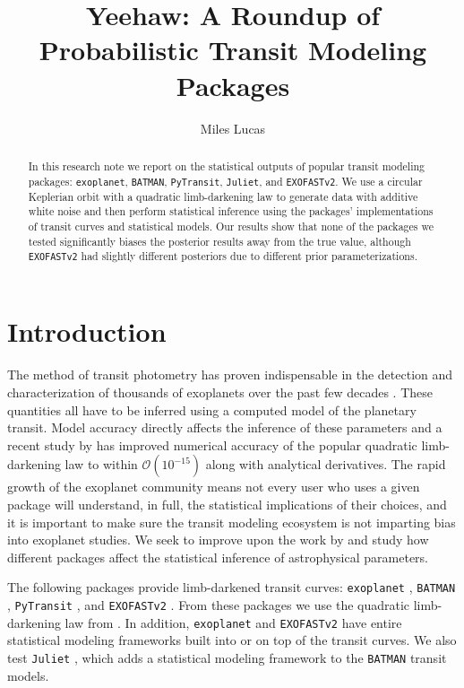 \documentclass[RNAAS]{aastex631}
\begin{document}
\title{Yeehaw: A Roundup of Probabilistic Transit Modeling Packages}


\author[0000-0001-6341-310X]{Miles Lucas}


\begin{abstract}
In this research note we report on the statistical outputs of popular transit modeling packages: \texttt{exoplanet}, \texttt{BATMAN}, \texttt{PyTransit}, \texttt{Juliet}, and \texttt{EXOFASTv2}. We use a circular Keplerian orbit with a quadratic limb-darkening law to generate data with additive white noise and then perform statistical inference using the packages' implementations of transit curves and statistical models. Our results show that none of the packages we tested significantly biases the posterior results away from the true value, although \texttt{EXOFASTv2} had slightly different posteriors due to different prior parameterizations.
\end{abstract}

\section{Introduction} 

The method of transit photometry has proven indispensable in the detection and characterization of thousands of exoplanets over the past few decades \citep{2007prpl.conf..701C,2009IAUS..253...99W,2010exop.book...55W,2010trex.book.....H}. These quantities all have to be inferred using a computed model of the planetary transit. Model accuracy directly affects the inference of these parameters and a recent study by \citet{2020AJ....159..123A} has improved numerical accuracy of the popular quadratic limb-darkening law \citep{2002ApJ...580L.171M} to within $\mathcal{O}(10^{-15})$ along with analytical derivatives. The rapid growth of the exoplanet community means not every user who uses a given package will understand, in full, the statistical implications of their choices, and it is important to make sure the transit modeling ecosystem is not imparting bias into exoplanet studies. We seek to improve upon the work by \citet{2020AJ....159..123A} and study how different packages affect the statistical inference of astrophysical parameters.

The following packages provide limb-darkened transit curves: \texttt{exoplanet} \citep{2019ascl.soft10005F}, \texttt{BATMAN} \citep{2015PASP..127.1161K}, \texttt{PyTransit} \citep{Parviainen2015}, and \texttt{EXOFASTv2} \citep{2019arXiv190709480E}. From these packages we use the quadratic limb-darkening law from \citet{2002ApJ...580L.171M}. In addition, \texttt{exoplanet} and \texttt{EXOFASTv2} have entire statistical modeling frameworks built into or on top of the transit curves. We also test \texttt{Juliet} \citep{2019MNRAS.490.2262E}, which adds a statistical modeling framework to the \texttt{BATMAN} transit models.
\end{document}
